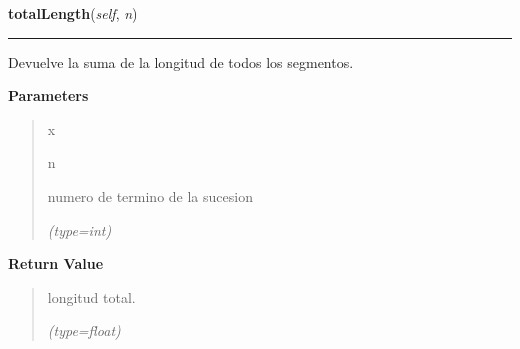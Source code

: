 \hspace{.8\funcindent}\begin{boxedminipage}{\funcwidth}

    \raggedright \textbf{totalLength}(\textit{self}, \textit{n})

    \vspace{-1.5ex}

    \rule{\textwidth}{0.5\fboxrule}
\setlength{\parskip}{2ex}
    Devuelve la suma de la longitud de todos los segmentos.

\setlength{\parskip}{1ex}
      \textbf{Parameters}
      \vspace{-1ex}

      \begin{quote}
        \begin{Ventry}{x}

          \item[n]

          numero de termino de la sucesion

            {\it (type=int)}

        \end{Ventry}

      \end{quote}

      \textbf{Return Value}
    \vspace{-1ex}

      \begin{quote}
      longitud total.

      {\it (type=float)}

      \end{quote}

    \end{boxedminipage}

    \label{FractalZE:arbol:Arbol:lindenmayer}

    \vspace{0.5ex}

